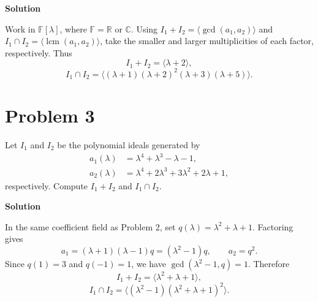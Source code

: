 \documentclass[UTF8,10pt,letterpaper,fontset=fandol]{ctexart}
\newcommand{\F}{\mathbb F}
\newcommand{\R}{\mathbb R}
\newcommand{\C}{\mathbb C}
\newcommand{\Ideal}[1]{\langle #1\rangle}
\newcommand{\Solution}{\par\Needspace{4\baselineskip}\textbf{Solution}\par}
\begin{document}
\Solution
Work in \(\F[\lambda]\), where \(\F=\R\) or \(\C\). Using
\(I_1+I_2=\Ideal{\gcd(a_1,a_2)}\) and
\(I_1\cap I_2=\Ideal{\operatorname{lcm}(a_1,a_2)}\), take the smaller and larger
multiplicities of each factor, respectively. Thus
\[
\boxed{I_1+I_2=\Ideal{\lambda+2}},
\]
\[
\boxed{I_1\cap I_2=\Ideal{(\lambda+1)(\lambda+2)^2(\lambda+3)(\lambda+5)}}.
\]

\section{Problem 3}
Let \(I_1\) and \(I_2\) be the polynomial ideals generated by
\[
\begin{aligned}
a_1(\lambda)&=\lambda^4+\lambda^3-\lambda-1,\\
a_2(\lambda)&=\lambda^4+2\lambda^3+3\lambda^2+2\lambda+1,
\end{aligned}
\]
respectively. Compute \(I_1+I_2\) and \(I_1\cap I_2\).

\Solution
In the same coefficient field as Problem 2, set \(q(\lambda)=\lambda^2+\lambda+1\). Factoring gives
\[
a_1=(\lambda+1)(\lambda-1)q=(\lambda^2-1)q,\qquad a_2=q^2.
\]
Since \(q(1)=3\) and \(q(-1)=1\), we have \(\gcd(\lambda^2-1,q)=1\). Therefore
\[
\boxed{I_1+I_2=\Ideal{\lambda^2+\lambda+1}},
\]
\[
\boxed{I_1\cap I_2=\Ideal{(\lambda^2-1)(\lambda^2+\lambda+1)^2}}.
\]
\end{document}
